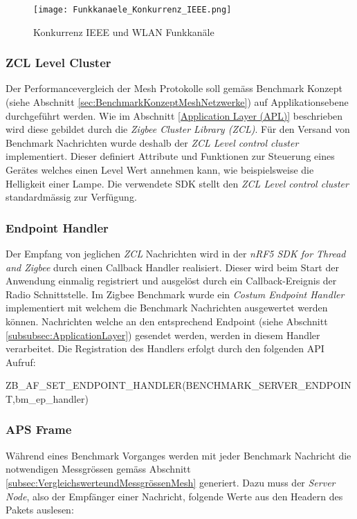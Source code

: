 \begin{figure}[h]
	\centering
	\texttt{[image: Funkkanaele\_Konkurrenz\_IEEE.png]}
	\caption{Konkurrenz IEEE und WLAN Funkkanäle \cite{markus_krause_rainer_konrad_drahtlose_2014}}
	\label{fig:KonkurrenzIEEEundWLANFunkkanäle}
\end{figure}

\subsubsection{ZCL Level Cluster}\label{subsubsec:ZCLLevelCluster}
Der Performancevergleich der Mesh Protokolle soll gemäss Benchmark Konzept (siehe Abschnitt \ref{sec:BenchmarkKonzeptMeshNetzwerke}) auf Applikationsebene durchgeführt werden.
Wie im Abschnitt \ref{Application Layer (APL)} beschrieben wird diese gebildet durch die \textit{Zigbee Cluster Library (ZCL)}.
Für den Versand von Benchmark Nachrichten wurde deshalb der \textit{ZCL Level control cluster} implementiert.
Dieser definiert Attribute und Funktionen zur Steuerung eines Gerätes welches einen Level Wert annehmen kann, wie beispielsweise die Helligkeit einer Lampe.
Die verwendete SDK stellt den \textit{ZCL Level control cluster} standardmässig zur Verfügung.\cite{the_zigbee_alliance_zigbee_2016}


\subsubsection{Endpoint Handler}\label{subsubsec:EnpointHandler}
Der Empfang von jeglichen \textit{ZCL} Nachrichten wird in der \textit{nRF5 SDK for Thread and Zigbee} durch einen Callback Handler realisiert.
Dieser wird beim Start der Anwendung einmalig registriert und ausgelöst durch ein Callback-Ereignis der Radio Schnittstelle.
Im Zigbee Benchmark wurde ein \textit{Costum Endpoint Handler} implementiert mit welchem die Benchmark Nachrichten ausgewertet werden können.
Nachrichten welche an den entsprechend Endpoint (siehe Abschnitt \ref{subsubsec:ApplicationLayer}) gesendet werden, werden in diesem Handler verarbeitet.
Die Registration des Handlers erfolgt durch den folgenden API Aufruf:

ZB\_AF\_SET\_ENDPOINT\_HANDLER(BENCHMARK\_SERVER\_ENDPOINT,\linebreak bm\_ep\_handler)

\subsubsection{APS Frame}\label{subsubsec:ZigbeeAPSFrame}
Während eines Benchmark Vorganges werden mit jeder Benchmark Nachricht die notwendigen Messgrössen gemäss Abschnitt \ref{subsec:VergleichswerteundMessgrössenMesh} generiert.
Dazu muss der \textit{Server Node}, also der Empfänger einer Nachricht, folgende Werte aus den Headern des Pakets auslesen:

